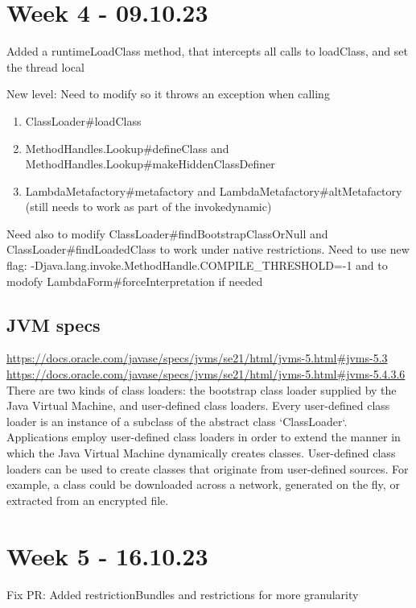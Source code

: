 \section{Week 4 - 09.10.23}
Added a runtimeLoadClass method, that intercepts all calls to loadClass, and set the thread local

New level:
Need to modify so it throws an exception when calling
\begin{enumerate}
    \item ClassLoader\#loadClass
    \item MethodHandles.Lookup\#defineClass and MethodHandles.Lookup\#makeHiddenClassDefiner
    \item LambdaMetafactory\#metafactory and LambdaMetafactory\#altMetafactory (still needs to work as part of the invokedynamic)
\end{enumerate}

Need also to modify ClassLoader\#findBootstrapClassOrNull and ClassLoader\#findLoadedClass to work under native restrictions.
Need to use new flag: -Djava.lang.invoke.MethodHandle.COMPILE\_THRESHOLD=-1 and to modofy LambdaForm\#forceInterpretation if needed

\subsection{JVM specs}
\url{https://docs.oracle.com/javase/specs/jvms/se21/html/jvms-5.html#jvms-5.3} \\
\url{https://docs.oracle.com/javase/specs/jvms/se21/html/jvms-5.html#jvms-5.4.3.6}
There are two kinds of class loaders: the bootstrap class loader supplied by the Java Virtual Machine, and user-defined class loaders. Every user-defined class loader is an instance of a subclass of the abstract class `ClassLoader`. Applications employ user-defined class loaders in order to extend the manner in which the Java Virtual Machine dynamically creates classes. User-defined class loaders can be used to create classes that originate from user-defined sources. For example, a class could be downloaded across a network, generated on the fly, or extracted from an encrypted file.

\section{Week 5 - 16.10.23}
Fix PR: Added restrictionBundles and restrictions for more granularity

